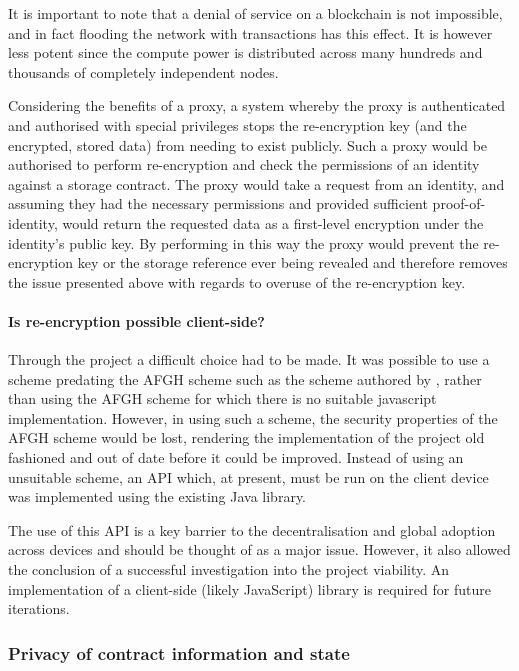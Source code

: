It is important to note that a denial of service on a blockchain is not impossible, and in fact flooding the network with transactions has this effect. It is however less potent since the compute power is distributed across many hundreds and thousands of completely independent nodes.

Considering the benefits of a proxy, a system whereby the proxy is authenticated and authorised with special privileges stops the re-encryption key (and the encrypted, stored data) from needing to exist publicly. Such a proxy would be authorised to perform re-encryption and check the permissions of an identity against a storage contract. The proxy would take a request from an identity, and assuming they had the necessary permissions and provided sufficient proof-of-identity, would return the requested data as a first-level encryption under the identity's public key. By performing in this way the proxy would prevent the re-encryption key or the storage reference ever being revealed and therefore removes the issue presented above with regards to overuse of the re-encryption key.

\paragraph{Is re-encryption possible client-side?}

Through the project a difficult choice had to be made. It was possible to use a scheme predating the AFGH scheme such as the scheme authored by \cite{bbs:1998:book}, rather than using the AFGH scheme for which there is no suitable javascript implementation. However, in using such a scheme, the security properties of the AFGH scheme would be lost, rendering the implementation of the project old fashioned and out of date before it could be improved. Instead of using an unsuitable scheme, an API which, at present, must be run on the client device was implemented using the existing Java library.

The use of this API is a key barrier to the decentralisation and global adoption across devices and should be thought of as a major issue. However, it also allowed the conclusion of a successful investigation into the project viability. An implementation of a client-side (likely JavaScript) library is required for future iterations.

\subsubsection{Privacy of contract information and state}

